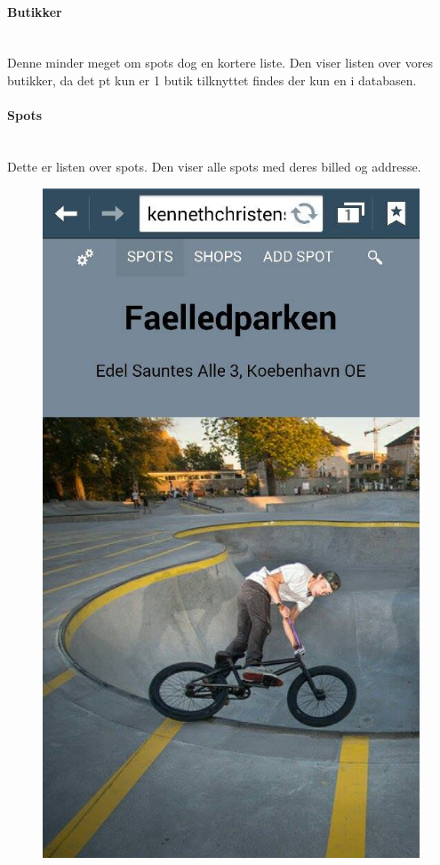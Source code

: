 \documentclass[12pt]{article}
\begin{document}
\paragraph{Butikker}\mbox{}\\
Denne minder meget om spots dog en kortere liste. Den viser listen over vores butikker, da det pt kun er 1 butik tilknyttet findes der kun en i databasen.\\

\newpage
\paragraph{Spots}\mbox{}\\
Dette er listen over spots. Den viser alle spots med deres billed og addresse.\\
\begin{figure}[h]
\includegraphics[scale = 0.3]{spot}
\end{figure}
\end{document}
